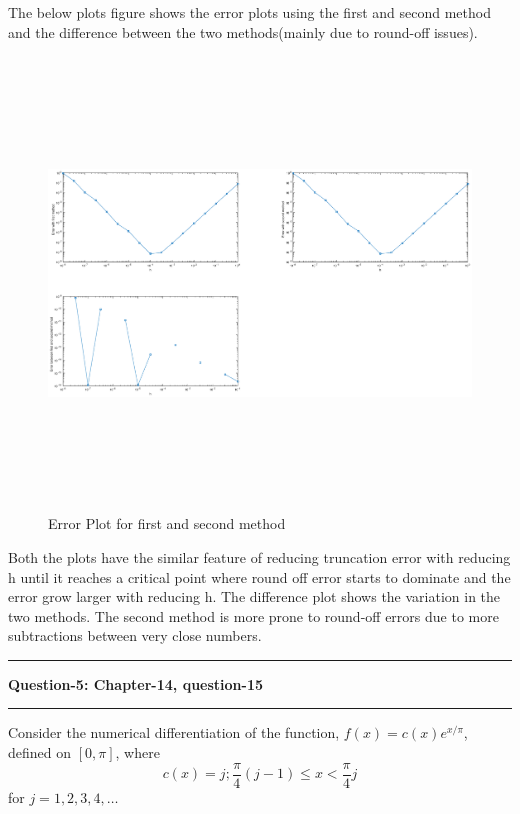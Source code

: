 \documentclass{article}
\newcommand\question[2]{\vspace{.25in}\hrule\textbf{#1: #2}\hrule\vspace{.10in}}
\begin{document}
	 
	  The below plots figure shows the error plots using the first and second method and the difference between the two methods(mainly due to round-off issues). 
  \begin{figure}[H]
   \centering
  \includegraphics[width=16cm, height=12cm]{Prob4}
  \caption{Error Plot for first and second method}
  \end{figure}

	  Both the plots have the similar feature of reducing truncation error with reducing h until it reaches a critical point where round off error starts to dominate and the error grow larger with reducing h. The difference plot shows the variation in the two methods. The second method is more prone to round-off errors due to more subtractions between very close numbers.
	  


  \question{Question-5}{Chapter-14, question-15}
  Consider the numerical differentiation of the function, $f(x) = c(x)e^{x/\pi}$, defined on $[0,\pi]$, where
  \[c(x) = j; \dfrac{\pi}{4}(j-1) \leq x < \dfrac{\pi}{4}j\]
  for $j=1,2,3,4,\dots$
\end{document}
